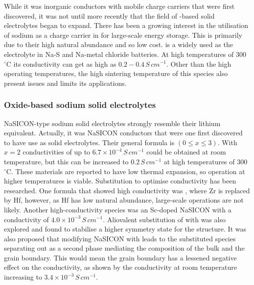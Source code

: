 \documentclass[10pt,a4paper, titlepage]{article}
\begin{document}
While it was inorganic conductors with mobile  charge carriers that were first discovered\cite{RN12}, it was not until more recently that the field of -based solid electrolytes began to expand. 
There has been a growing interest in the utilisation of sodium as a charge carrier in for large-scale energy storage. 
This is primarily due to their high natural abundance and so low cost. 
 is a widely used as the electrolyte in Na-S and Na-metal chloride batteries. 
At high  temperatures of 300 $^{\circ}$C its conductivity can get as high as $0.2-0.4 \, S \, cm^{-1}$. \cite{RN29} 
Other than the high operating temperatures, the high sintering temperature of this species also present issues and limits its applications. 

\subsubsection{Oxide-based sodium solid electrolytes}

NaSICON-type sodium solid electrolytes strongly resemble their lithium equivalent. 
Actually, it was NaSICON conductors that were one first discovered to have use as solid electrolytes. \cite{RN30}
Their general formula is  $(0 \leq x \leq 3)$. 
With $ x = 2 $ conductivities of up to $6.7 \times 10^{-4} \, S \, cm^{-1}$ could be obtained at room temperature, but this can be increased to $0.2 \, S \, cm^{-1}$ at high temperatures of 300 $ ^{\circ} $C. \cite{RN31}
These materials are reported to have low thermal expansion, so operation at higher temperatures is viable.
Substitution to optimise conductivity has been researched. 
One formula that showed high conductivity was , where Zr is replaced by Hf, however, as Hf has low natural abundance, large-scale operations are not likely. \cite{RN32}
Another high-conductivity species was an Sc-doped NaSICON with a conductivity of $4.0 \times 10^{-3} \, S \, cm^{-1}$. \cite{RN33} 
Aliovalent substitution of  with  was also explored and found to stabilise a higher symmetry state for the structure. \cite{RN34}
It was also proposed that modifying NaSICON with  leads to the substituted species separating out as a second phase mediating the composition of the bulk and the grain boundary. 
This would mean the grain boundary has a lessened negative effect on the conductivity, as shown by the conductivity at room temperature increasing to $3.4 \times 10^{-3} \, S \, cm^{-1}$. \cite{RN3}
\end{document}
